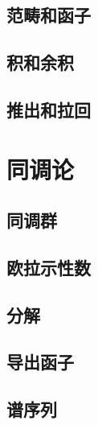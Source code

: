 \documentclass[../main.tex]{subfiles}
\begin{document}
\subsection{范畴和函子}
\subsection{积和余积}
\subsection{推出和拉回}
\section{同调论}
\subsection{同调群}
\subsection{欧拉示性数}
\subsection{分解}
\subsection{导出函子}
\subsection{谱序列}
\biblio
\end{document}
